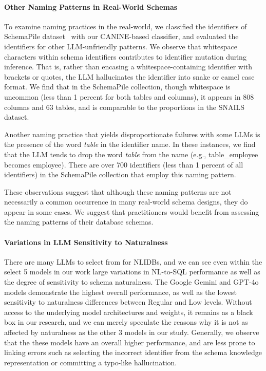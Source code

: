 \paragraph{\textbf{Other Naming Patterns in Real-World Schemas}}
To examine naming practices in the real-world, we classified the identifiers of SchemaPile dataset~\cite{doehmen2024schemapile} with our CANINE-based classifier, and evaluated the identifiers for other LLM-unfriendly patterns.
We observe that whitespace characters within schema identifiers contributes to identifier mutation during inference.
That is, rather than encasing a whitespace-containing identifier with brackets or quotes, the LLM hallucinates the identifier into snake or camel case format.
We find that in the SchemaPile collection, though whitespace is uncommon (less than 1 percent for both tables and columns), it appears in 808 columns and 63 tables, and is comparable to the proportions in the SNAILS dataset.

Another naming practice that yields disproportionate failures with some LLMs is the presence of the word \emph{table} in the identifier name.
In these instances, we find that the LLM tends to drop the word \emph{table} from the name (e.g., table\_employee becomes employee).
There are over 700 identifiers (less than 1 percent of all identifiers) in the SchemaPile collection that employ this naming pattern.

These observations suggest that although these naming patterns are not necessarily a common occurrence in many real-world schema designs, they do appear in some cases. 
We suggest that practitioners would benefit from assessing the naming patterns of their database schemas.


\paragraph{\textbf{Variations in LLM Sensitivity to Naturalness}}
There are many LLMs to select from for NLIDBs, and we can see even within the select 5 models in our work large variations in NL-to-SQL performance as well as the degree of sensitivity to schema naturalness.
The Google Gemini and GPT-4o models demonstrate the highest overall performance, as well as the lowest sensitivity to naturalness differences between Regular and Low levels.
Without access to the underlying model architectures and weights, it remains as a black box in our research, and we can merely speculate the reasons why it is not as affected by naturalness as the other 3 models in our study.
Generally, we observe that the these models have an overall higher performance, and are less prone to linking errors such as selecting the incorrect identifier from the schema knowledge representation or committing a typo-like hallucination.

